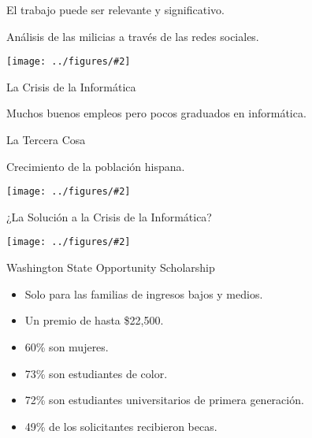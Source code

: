 \documentclass{beamer}
\newcommand{\fig}[2]{
  \texttt{[image: ../figures/\#2]}
}
\begin{document}
\begin{centering}
\begin{frame}[fragile]{El trabajo puede ser relevante y significativo.}
  
  {Análisis de las milicias a través de las redes sociales.}
  
  
  \vfill
  
  \fig{1.0}{saiph}
  
  
  
\end{frame}

\begin{frame}[fragile]{La Crisis de la Informática}
  
  {Muchos buenos empleos pero pocos graduados en informática.}
  
  \vfill
  
  
  
\end{frame}

\begin{frame}[fragile]{La Tercera Cosa}
  \pause
  
  Crecimiento de la población hispana.
  \vfill
  \fig{1.0}{hispanicpopgrowth}
\end{frame}


\begin{frame}[fragile]{¿La Solución a la Crisis de la Informática?}
  \pause
  

  
  \fig{1.0}{whitesdominate}
\end{frame}


\begin{frame}[fragile]{Washington State Opportunity Scholarship}


  \begin{itemize}
  \item Solo para las familias de ingresos bajos y medios.
  \item Un premio de hasta \$22,500.
  \item 60\% son mujeres.
  \item 73\% son estudiantes de color.
  \item 72\% son estudiantes universitarios de primera generación.
  \item 49\% de los solicitantes recibieron becas.
  \end{itemize}


\end{frame}
\end{centering}
\end{document}
